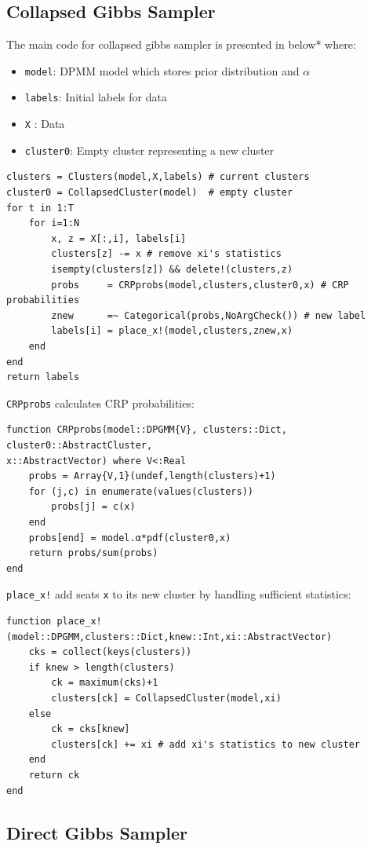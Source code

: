 \documentclass[a4paper]{article}
\begin{document}
\subsection{Collapsed Gibbs Sampler}

The main code for collapsed gibbs sampler is presented in below* where:

\begin{itemize}
\item
  \texttt{model}: DPMM model which stores prior distribution and
  \(\alpha\) 
\item
  \texttt{labels}: Initial labels for data
\item
  \texttt{X} : Data
\item
  \texttt{cluster0}: Empty cluster representing a new cluster
\end{itemize}
\begin{lstlisting}
clusters = Clusters(model,X,labels) # current clusters
cluster0 = CollapsedCluster(model)  # empty cluster
for t in 1:T
 	for i=1:N
        x, z = X[:,i], labels[i]
        clusters[z] -= x # remove xi's statistics
        isempty(clusters[z]) && delete!(clusters,z)
        probs     = CRPprobs(model,clusters,cluster0,x) # CRP probabilities
        znew      =~ Categorical(probs,NoArgCheck()) # new label
        labels[i] = place_x!(model,clusters,znew,x)
    end
end
return labels
\end{lstlisting}

\texttt{CRPprobs} calculates CRP probabilities:
\begin{lstlisting}
function CRPprobs(model::DPGMM{V}, clusters::Dict, cluster0::AbstractCluster, 
x::AbstractVector) where V<:Real
    probs = Array{V,1}(undef,length(clusters)+1)
    for (j,c) in enumerate(values(clusters))
        probs[j] = c(x)
    end
    probs[end] = model.α*pdf(cluster0,x)
    return probs/sum(probs)
end
\end{lstlisting}
\texttt{place\_x!} add seats \texttt{x} to its new cluster by handling
sufficient statistics:
\begin{lstlisting}
function place_x!(model::DPGMM,clusters::Dict,knew::Int,xi::AbstractVector)
    cks = collect(keys(clusters))
    if knew > length(clusters)
        ck = maximum(cks)+1
        clusters[ck] = CollapsedCluster(model,xi)
    else
        ck = cks[knew]
        clusters[ck] += xi # add xi's statistics to new cluster
    end
    return ck
end
\end{lstlisting}


\subsection{Direct Gibbs Sampler}
\end{document}
